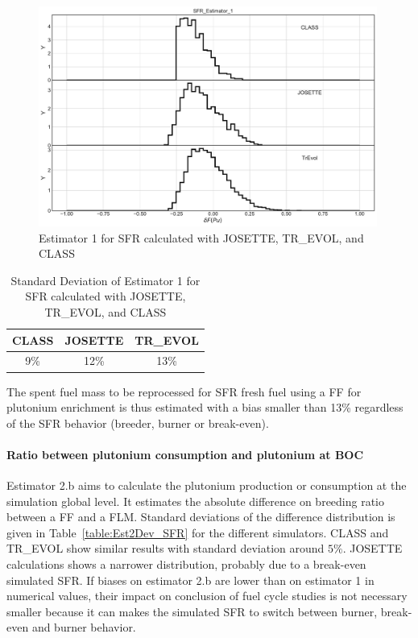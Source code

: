 \begin{figure}[h]
	\begin{center}
		\includegraphics[width = 0.99\textwidth]{../../Feature_1/RAW_DATA/FIG/SFR_Estimator_1.pdf}
		\caption{Estimator 1 for \gls{SFR} calculated with JOSETTE, TR\_EVOL, and CLASS}
		\label{fig:Est1_SFR}
	\end{center}
\end{figure}

\begin{table}[h]
	\begin{center}
		\begin{tabular}{|c||c||c|}
			\hline 
				CLASS & JOSETTE & TR\_EVOL \\
			\hline
				9\% & 12\% & 13\% \\
			\hline
		\end{tabular}
	\end{center}
		\caption{Standard Deviation of Estimator 1 for \gls{SFR} calculated with JOSETTE, TR\_EVOL, and CLASS}
	\label{table:Est1Dev_SFR}
\end{table}

The spent fuel mass to be reprocessed for \gls{SFR} fresh fuel using a \gls{FF} for plutonium enrichment is thus estimated with a bias smaller than 13\% regardless of the \gls{SFR} behavior (breeder, burner or break-even).  

\paragraph{Ratio between plutonium consumption and plutonium at \gls{BOC}}

Estimator 2.b aims to calculate the plutonium production or consumption at the simulation global level.
It estimates the absolute difference on breeding ratio between a \gls{FF} and a \gls{FLM}. 
Standard deviations of the difference distribution is given in Table~\ref{table:Est2Dev_SFR} for the different simulators.
CLASS and TR\_EVOL show similar results with standard deviation around $5\%$.
JOSETTE calculations shows a narrower distribution, probably due to a break-even simulated \gls{SFR}.
If biases on estimator 2.b are lower than on estimator 1 in numerical values, their impact on conclusion of fuel cycle studies is not necessary smaller because it can makes the simulated \gls{SFR} to switch between burner, break-even and burner behavior.

